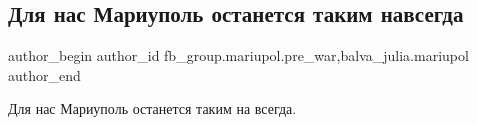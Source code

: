  
 
 
 
 

\subsection{Для нас Мариуполь останется таким навсегда}
\label{sec:24_02_2023.fb.fb_group.mariupol.pre_war.3.dlya_nas_mariupol_os}
 
\ifcmt
 author_begin
   author_id fb_group.mariupol.pre_war,balva_julia.mariupol
 author_end
\fi

Для нас Мариуполь останется таким на всегда.

